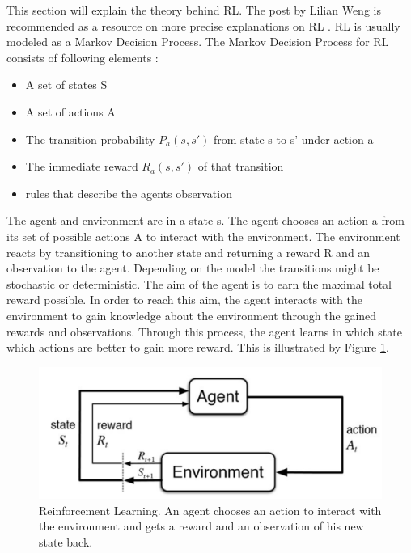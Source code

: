 \vspace{0.5cm}

This section will explain the theory behind RL. The post by Lilian Weng is recommended as a resource on more precise explanations on RL \cite{rllilianweng}. RL is usually modeled as a Markov Decision Process. The Markov Decision Process for RL consists of following elements \cite{rlwiki}:

\begin{itemize}
	\item A set of states S
	\item A set of actions A
	\item The transition probability $P_a(s,s')$ from state s to s' under action a
	\item The immediate reward $R_a(s,s')$ of that transition
	\item rules that describe the agents observation
\end{itemize}

The agent and environment are in a state s. The agent chooses an action a from its set of possible actions A to interact with the environment. The environment reacts by transitioning to another state and returning a reward R and an observation to the agent. Depending on the model the transitions might be stochastic or deterministic. The aim of the agent is to earn the maximal total reward possible. In order to reach this aim, the agent interacts with the environment to gain knowledge about the environment through the gained rewards and observations. Through this process, the agent learns in which state which actions are better to gain more reward. This is illustrated by Figure \ref{rl_general}.

\begin{figure} [h]
	
	\centering
	\includegraphics[width=1\textwidth]{figures/rl_general.pdf}
	\caption{Reinforcement Learning. An agent chooses an action to interact with the environment and gets a reward and an observation of his new state back. 
		\label{rl_general}	
		\cite{rl_general.jpg}
	}
\end{figure}

